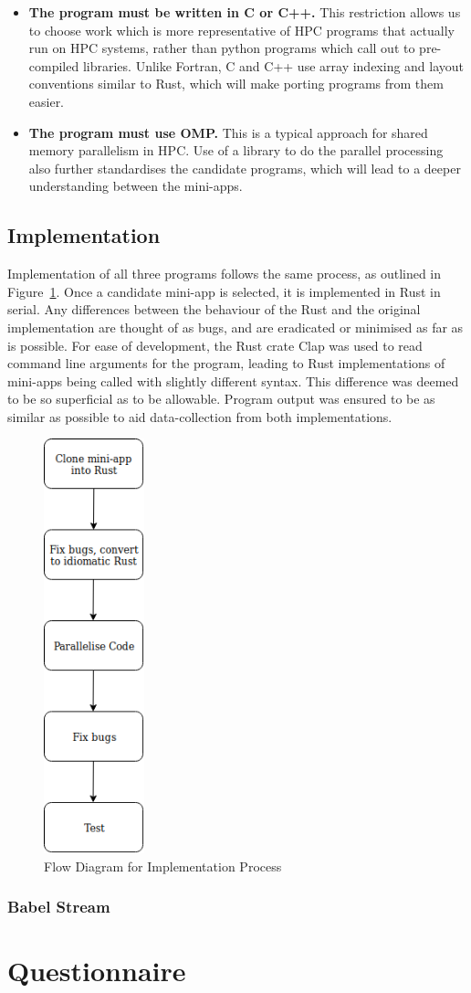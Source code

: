 \begin{itemize}
  \item \textbf{The program must be written in C or C++.} This restriction allows us to choose work which is more representative of HPC programs that actually run on HPC systems, rather than python programs which call out to pre-compiled libraries. Unlike Fortran, C and C++ use array indexing and layout conventions similar to Rust, which will make porting programs from them easier.

  \item \textbf{The program must use OMP.} This is a typical approach for shared memory parallelism in HPC. Use of a library to do the parallel processing also further standardises the candidate programs, which will lead to a deeper understanding between the mini-apps.
\end{itemize}

\subsection{Implementation}
Implementation of all three programs follows the same process, as outlined in Figure~\ref{fig:imp-flow}. Once a candidate mini-app is selected, it is implemented in Rust in serial. Any differences between the  behaviour of the Rust and the original implementation are thought of as bugs, and are eradicated or minimised as far as is possible. For ease of development, the Rust crate Clap was used to read command line arguments for the program, leading to Rust implementations of mini-apps being called with slightly different syntax. This difference was deemed to be so superficial as to be allowable. Program output was ensured to be as similar as possible to aid data-collection from both implementations.

\begin{figure}
  \center
  \includegraphics[height=12cm]{figs/ImplementationFlow.png}
  \caption{Flow Diagram for Implementation Process}
  \label{fig:imp-flow}
\end{figure}
\subsubsection{Babel Stream}

\section{Questionnaire}
